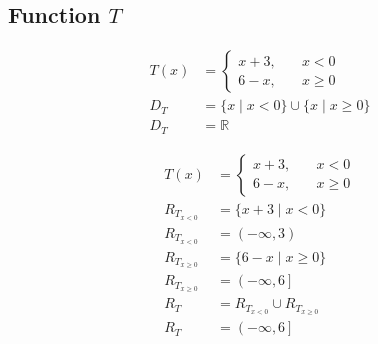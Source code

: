 \documentclass[12pt, letterpaper]{article}
\begin{document}
        \subsection{Function \(T\)}
        \vspace{-2pt}
        \begin{minipage}{0.5\textwidth}
            \begin{align*}
                T(x) &= \begin{cases} x+3, \quad &x<0 \\ 6-x, \quad &x \geq 0 \end{cases} \\
                D_T &= \{ x \mid x < 0 \} \cup \{ x \mid x \geq 0 \} \\ 
                D_T &= \mathbb{R}
            \end{align*}
        \end{minipage}
        \begin{minipage}{0.5\textwidth}
            \begin{align*}
                T(x) &= \begin{cases} x+3, \quad &x<0 \\ 6-x, \quad &x \geq 0 \end{cases} \\
                    R_{T_{x<0}} &= \{ x+3 \mid x < 0 \} \\ 
                R_{T_{x<0}} &= \left( -\infty, 3 \right) \\
                R_{T_{x\geq0}} &= \{ 6-x \mid x \geq 0 \} \\ 
                R_{T_{x\geq0}} &= \left( -\infty, 6 \right] \\
                R_T &= R_{T_{x<0}} \cup R_{T_{x\geq0}} \\
                R_T &= \left( -\infty, 6 \right]
            \end{align*}
        \end{minipage}
\end{document}
